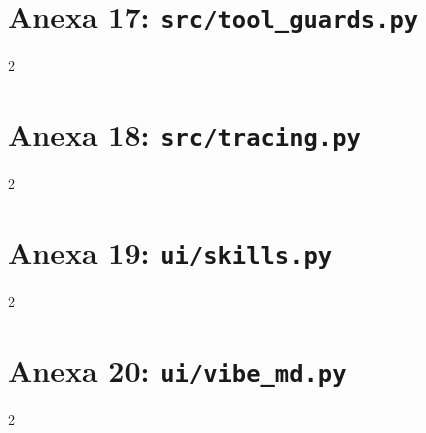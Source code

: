 \section*{Anexa 17: \texttt{src/tool\_guards.py}}
\begin{multicols}{2}

\end{multicols}


\section*{Anexa 18: \texttt{src/tracing.py}}
\begin{multicols}{2}

\end{multicols}


\section*{Anexa 19: \texttt{ui/skills.py}}
\begin{multicols}{2}

\end{multicols}


\section*{Anexa 20: \texttt{ui/vibe\_md.py}}
\begin{multicols}{2}

\end{multicols}
